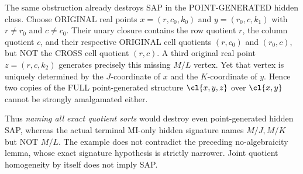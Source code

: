 \begin{example}
The same obstruction already destroys
SAP in the POINT-GENERATED hidden class.
Choose ORIGINAL real points
$x=(r,c_0,k_0)$ and $y=(r_0,c,k_1)$
with $r\ne r_0$ and $c\ne c_0$.
Their unary closure contains the
row quotient $r$, the column quotient
$c$, and their respective ORIGINAL
cell quotients $(r,c_0)$ and $(r_0,c)$,
but NOT the CROSS cell quotient $(r,c)$.
A third original real point
$z=(r,c,k_2)$ generates precisely
this missing $M/L$ vertex. Yet that
vertex is uniquely determined by
the $J$-coordinate of $x$ and the
$K$-coordinate of $y$. Hence two
copies of the FULL point-generated
structure $\cl\{x,y,z\}$ over
$\cl\{x,y\}$ cannot be strongly
amalgamated either.

Thus \emph{naming all exact quotient sorts}
would destroy even point-generated
hidden SAP, whereas the actual terminal
MI-only hidden signature names
$M/J,M/K$ but NOT $M/L$.
The example does not contradict the
preceding no-algebraicity lemma,
whose exact signature hypothesis is
strictly narrower. Joint quotient
homogeneity by itself does not imply SAP.
\end{example}

